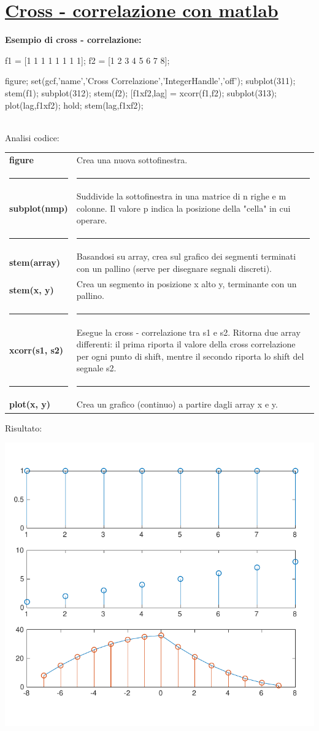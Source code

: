 \documentclass[a4paper, 10pt]{report}
\begin{document}
\section*{\underline{Cross - correlazione con matlab}}

\textbf{Esempio di cross - correlazione:}

\begin{code}
f1 = [1 1 1 1 1 1 1 1]; %
f2 = [1 2 3 4 5 6 7 8]; %

figure; set(gcf,'name','Cross Correlazione','IntegerHandle','off');
subplot(311); stem(f1);
subplot(312); stem(f2);
[f1xf2,lag] = xcorr(f1,f2);
subplot(313); plot(lag,f1xf2); hold; stem(lag,f1xf2);
\end{code}

\noindent \\Analisi codice:

\begin{longtable}{| p{} | p{} |}

\textbf{figure} & Crea una nuova sottofinestra.
\\
\hrule & \hrule
\\
\textbf{subplot(nmp)} & Suddivide la sottofinestra in una matrice di n righe e m colonne. Il valore p indica la posizione della "cella" in cui operare.
\\
\hrule & \hrule
\\
\textbf{stem(array)} & Basandosi su array, crea sul grafico dei segmenti terminati con un pallino (serve per disegnare segnali discreti).
\\
\textbf{stem(x, y)} & Crea un segmento in posizione x alto y, terminante con un pallino.
\\
\hrule & \hrule
\\
\textbf{xcorr(s1, s2)} & Esegue la cross - correlazione tra s1 e s2. Ritorna due array differenti: il prima riporta il valore della cross correlazione per ogni punto di shift, mentre il secondo riporta lo shift del segnale s2. 
\\
\hrule & \hrule
\\
\textbf{plot(x, y)} & Crea un grafico (continuo) a partire dagli array x e y.
\\
\end{longtable}

\noindent Risultato:

\begin{center}
\includegraphics[scale=1]{es1.pdf}
\end{center}
\end{document}
